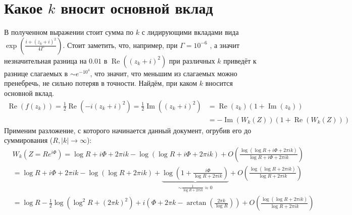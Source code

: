 \documentclass[a4paper, 12pt]{article}
\DeclareMathOperator*{\Real}{Re}
\DeclareMathOperator*{\Imag}{Im}
\begin{document}
\section*{Какое $k$ вносит основной вклад}
В полученном выражении стоит сумма по $k$ с лидирующими вкладами вида $\exp\left(\frac{i+(z_k+i)^2}{4\Gamma}\right)$. Стоит заметить, что, например, при $\Gamma = 10^{-6}$ , а значит незначительная разница на $0.01$ в $\Real\left((z_k+i)^2\right)$ при различных $k$ приведёт к разнице слагаемых в $\sim e^{-10^4}$, что значит, что меньшим из слагаемых можно пренебречь, не сильно потеряв в точности. Найдём, при каком $k$ вносится основной вклад. 
\begin{equation}
\begin{aligned}
    \Real\left(f(z_k)\right) = \frac{1}{2}\Real\left(-i(z_k+i)^2\right) = \frac{1}{2}\Imag\left((z_k+i)^2\right) 
    &= \Real\left(z_k\right)\left(1+\Imag(z_k)\right)\\
    &= -\Imag(W_k(Z))\left(1+\Real(W_k(Z))\right)
\end{aligned}
\end{equation}
Применим разложение, с которого начинается данный документ, огрубив его до суммирования ($R, |k| \rightarrow \infty$):
\begin{equation}\label{W_k_approx}
\begin{aligned}
    &W_k\left(Z=R e^{i\Phi}\right) = \log R + i\Phi + 2\pi i k - \log\left(\log R + i\Phi+ 2\pi i k\right) + O\left(\frac{\log\left(\log R + i\Phi+ 2\pi i k\right)}{\log R + i\Phi + 2\pi i k}\right)\\
    &= \log R + i\Phi + 2\pi i k - \log\left(\log R + 2\pi i k\right) + \underbrace{\log\left(1+\frac{i\Phi}{\log R +  2\pi i k}\right)}_{\sim \frac{1}{\log R  + 2\pi i k} \approx 0} + O\left(\frac{\log\left(\log R + 2\pi i k\right)}{\log R  + 2\pi i k}\right)\\
    &= \log R - \frac{1}{2}\log\left(\log^2 R + (2\pi k)^2\right) + 
    i\left(\Phi + 2\pi k - \arctan\left(\frac{2\pi k}{\log R}\right)\right) 
    + O\left(\frac{\log\left(\log R + 2\pi i k\right)}{\log R  + 2\pi i k}\right)
\end{aligned}
\end{equation}
\end{document}
